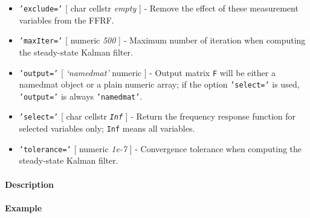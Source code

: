  \begin{itemize}
 \item
   \texttt{'exclude='} {[} char \textbar{} cellstr \textbar{}
   \emph{empty} {]} - Remove the effect of these measurement variables
   from the FFRF.
 \item
   \texttt{'maxIter='} {[} numeric \textbar{} \emph{500} {]} - Maximum
   number of iteration when computing the steady-state Kalman filter.
 \item
   \texttt{'output='} {[} \emph{`namedmat'} \textbar{} numeric {]} -
   Output matrix \texttt{F} will be either a namedmat object or a plain
   numeric array; if the option \texttt{'select='} is used,
   \texttt{'output='} is always \texttt{'namedmat'}.
 \item
   \texttt{'select='} {[} char \textbar{} cellstr \textbar{}
   \emph{\texttt{Inf}} {]} - Return the frequency response function for
   selected variables only; \texttt{Inf} means all variables.
 \item
   \texttt{'tolerance='} {[} numeric \textbar{} \emph{1e-7} {]} -
   Convergence tolerance when computing the steady-state Kalman filter.
 \end{itemize}
 
 \paragraph{Description}
 
 \paragraph{Example}



